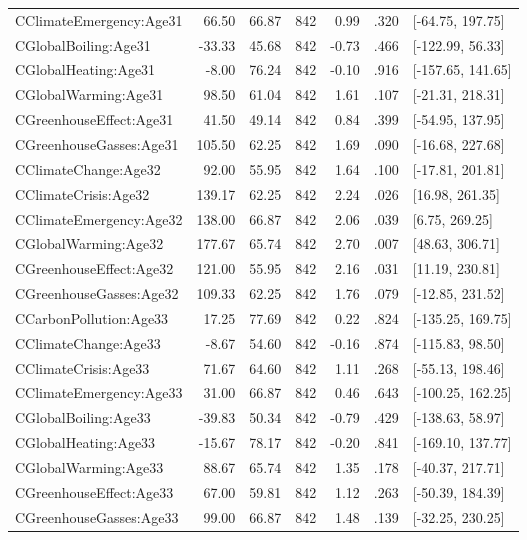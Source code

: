 \begin{table}[ht]
\begin{tabular}{lrrrrrl}
  CClimateEmergency:Age31 & 66.50 & 66.87 & 842 & 0.99 & .320 & [-64.75, 197.75] \\ 
  CGlobalBoiling:Age31 & -33.33 & 45.68 & 842 & -0.73 & .466 & [-122.99, 56.33] \\ 
  CGlobalHeating:Age31 & -8.00 & 76.24 & 842 & -0.10 & .916 & [-157.65, 141.65] \\ 
  CGlobalWarming:Age31 & 98.50 & 61.04 & 842 & 1.61 & .107 & [-21.31, 218.31] \\ 
  CGreenhouseEffect:Age31 & 41.50 & 49.14 & 842 & 0.84 & .399 & [-54.95, 137.95] \\ 
  CGreenhouseGasses:Age31 & 105.50 & 62.25 & 842 & 1.69 & .090 & [-16.68, 227.68] \\ 
  CClimateChange:Age32 & 92.00 & 55.95 & 842 & 1.64 & .100 & [-17.81, 201.81] \\ 
  CClimateCrisis:Age32 & 139.17 & 62.25 & 842 & 2.24 & .026 & [16.98, 261.35] \\ 
  CClimateEmergency:Age32 & 138.00 & 66.87 & 842 & 2.06 & .039 & [6.75, 269.25] \\ 
  CGlobalWarming:Age32 & 177.67 & 65.74 & 842 & 2.70 & .007 & [48.63, 306.71] \\ 
  CGreenhouseEffect:Age32 & 121.00 & 55.95 & 842 & 2.16 & .031 & [11.19, 230.81] \\ 
  CGreenhouseGasses:Age32 & 109.33 & 62.25 & 842 & 1.76 & .079 & [-12.85, 231.52] \\ 
  CCarbonPollution:Age33 & 17.25 & 77.69 & 842 & 0.22 & .824 & [-135.25, 169.75] \\ 
  CClimateChange:Age33 & -8.67 & 54.60 & 842 & -0.16 & .874 & [-115.83, 98.50] \\ 
  CClimateCrisis:Age33 & 71.67 & 64.60 & 842 & 1.11 & .268 & [-55.13, 198.46] \\ 
  CClimateEmergency:Age33 & 31.00 & 66.87 & 842 & 0.46 & .643 & [-100.25, 162.25] \\ 
  CGlobalBoiling:Age33 & -39.83 & 50.34 & 842 & -0.79 & .429 & [-138.63, 58.97] \\ 
  CGlobalHeating:Age33 & -15.67 & 78.17 & 842 & -0.20 & .841 & [-169.10, 137.77] \\ 
  CGlobalWarming:Age33 & 88.67 & 65.74 & 842 & 1.35 & .178 & [-40.37, 217.71] \\ 
  CGreenhouseEffect:Age33 & 67.00 & 59.81 & 842 & 1.12 & .263 & [-50.39, 184.39] \\ 
  CGreenhouseGasses:Age33 & 99.00 & 66.87 & 842 & 1.48 & .139 & [-32.25, 230.25] \\ 

\end{tabular}
\end{table}
